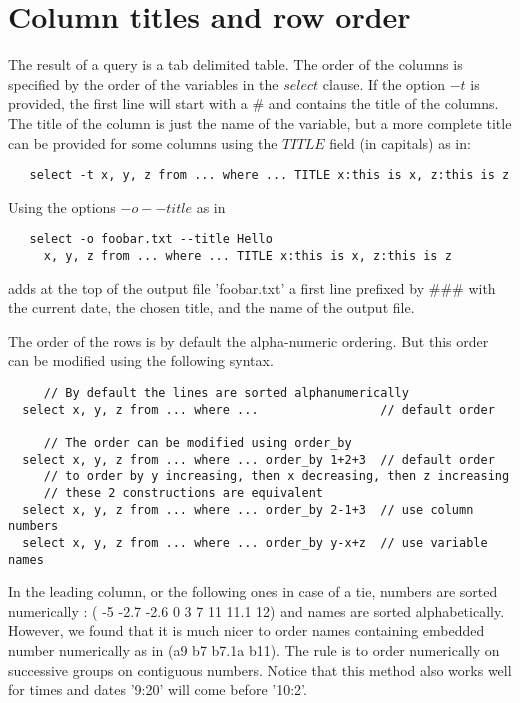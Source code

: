 \documentclass[11pt]{article}
\newcommand{\BL}{\begin{lstlisting}}
\begin{document}
\section{Column titles and row order}

The result of a query is a tab delimited table. 
The order of the columns is specified by the order of the variables in the $select$ clause.
If the option $-$$t$ is provided, the first line will start with a \# and contains the title of the columns.
The title of the column is just the name of the variable, but a more 
complete title can be provided for some columns using the $TITLE$ field (in capitals)  as in:
\BL
   select -t x, y, z from ... where ... TITLE x:this is x, z:this is z
\end{lstlisting}
Using the options $-o --title$ as in 
\BL
   select -o foobar.txt --title Hello 
     x, y, z from ... where ... TITLE x:this is x, z:this is z
\end{lstlisting}
adds at the top of the output file 'foobar.txt'
a first line prefixed by $\#\#\#$ with the current date, the chosen title, and the name of the output file.

The order of the rows is by default the alpha-numeric ordering.
But this order can be modified using the following syntax.

\BL
     // By default the lines are sorted alphanumerically
  select x, y, z from ... where ...                 // default order

     // The order can be modified using order_by
  select x, y, z from ... where ... order_by 1+2+3  // default order
     // to order by y increasing, then x decreasing, then z increasing
     // these 2 constructions are equivalent
  select x, y, z from ... where ... order_by 2-1+3  // use column numbers
  select x, y, z from ... where ... order_by y-x+z  // use variable names
\end{lstlisting}
In the leading column, or the following ones in case of a tie,
numbers are sorted numerically : ( -5 -2.7 -2.6 0 3 7 11 11.1 12) 
and names are sorted alphabetically. However, we found\cite {DTM94} that it is much nicer to
order names containing embedded number numerically as in (a9 b7 b7.1a b11). 
The rule is to order numerically on successive groups on contiguous numbers.
Notice that this method also works well for times and dates
'9:20' will come before '10:2'.

\end{document}
